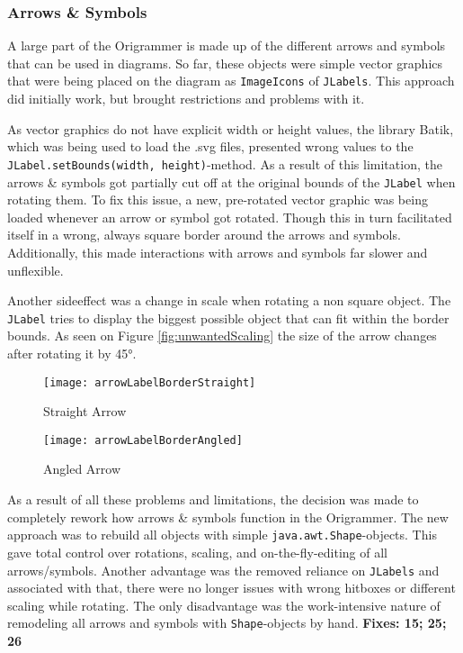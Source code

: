 \subsubsection{Arrows \& Symbols}
A large part of the Origrammer is made up of the different arrows and symbols that can be used in diagrams. So far, these objects were simple vector graphics that were being placed on the diagram as \texttt{ImageIcons} of \texttt{JLabels}. This approach did initially work, but brought restrictions and problems with it.

 As vector graphics do not have explicit width or height values, the library Batik\cite{batik}, which was being used to load the .svg files, presented wrong values to the \texttt{JLabel.setBounds(width, height)}-method. As a result of this limitation, the arrows \& symbols got partially cut off at the original bounds of the \texttt{JLabel} when rotating them. To fix this issue, a new, pre-rotated vector graphic was being loaded whenever an arrow or symbol got rotated. Though this in turn facilitated itself in a wrong, always square border around the arrows and symbols. Additionally, this made interactions with arrows and symbols far slower and unflexible.
 
 Another sideeffect was a change in scale when rotating a non square object. The \texttt{JLabel} tries to display the biggest possible object that can fit within the border bounds. As seen on Figure \ref{fig:unwantedScaling} the size of the arrow changes after rotating it by 45°.

\begin{figure*}[htbp]
	\centering
	\begin{subfigure}{0.3\textwidth}
		\texttt{[image: arrowLabelBorderStraight]}
		\caption{Straight Arrow}
		\label{fig:arrowLabelBorderStraight}
	\end{subfigure}
	\begin{subfigure}{0.3\textwidth}
		\texttt{[image: arrowLabelBorderAngled]}
		\caption{Angled Arrow}
		\label{fig:arrowLabelBorderAngled}
	\end{subfigure}
	\caption{Unwanted Scaling when Rotating}
	\label{fig:unwantedScaling}
\end{figure*}

As a result of all these problems and limitations, the decision was made to completely rework how arrows \& symbols function in the Origrammer. The new approach was to rebuild all objects with simple \texttt{java.awt.Shape}-objects. This gave total control over rotations, scaling, and on-the-fly-editing of all arrows/symbols. Another advantage was the removed reliance on \texttt{JLabels} and associated with that, there were no longer issues with wrong hitboxes or different scaling while rotating. The only disadvantage was the work-intensive nature of remodeling all arrows and symbols with \texttt{Shape}-objects by hand.
\newline
\textbf{Fixes: 15; 25; 26}
